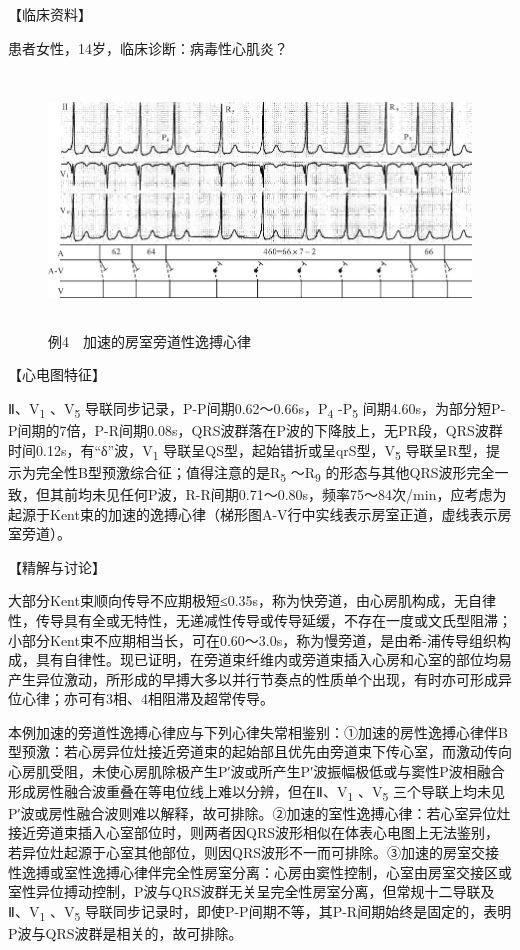 【临床资料】

患者女性，14岁，临床诊断：病毒性心肌炎？

\begin{figure}[!htbp]
 \centering
 \includegraphics[width=5.75in,height=2.65625in]{./images/Image00762.jpg}
 \captionsetup{justification=centering}
 \caption{例4　加速的房室旁道性逸搏心律}
 \label{fig50-4}
  \end{figure} 

【心电图特征】

Ⅱ、V\textsubscript{1} 、V\textsubscript{5}
导联同步记录，P-P间期0.62～0.66s，P\textsubscript{4} -P\textsubscript{5}
间期4.60s，为部分短P-P间期的7倍，P-R间期0.08s，QRS波群落在P波的下降肢上，无PR段，QRS波群时间0.12s，有“δ”波，V\textsubscript{1}
导联呈QS型，起始错折或呈qrS型，V\textsubscript{5}
导联呈R型，提示为完全性B型预激综合征；值得注意的是R\textsubscript{5}
～R\textsubscript{9}
的形态与其他QRS波形完全一致，但其前均未见任何P波，R-R间期0.71～0.80s，频率75～84次/min，应考虑为起源于Kent束的加速的逸搏心律（梯形图A-V行中实线表示房室正道，虚线表示房室旁道）。

【精解与讨论】

大部分Kent束顺向传导不应期极短≤0.35s，称为快旁道，由心房肌构成，无自律性，传导具有全或无特性，无递减性传导或传导延缓，不存在一度或文氏型阻滞；小部分Kent束不应期相当长，可在0.60～3.0s，称为慢旁道，是由希-浦传导组织构成，具有自律性。现已证明，在旁道束纤维内或旁道束插入心房和心室的部位均易产生异位激动，所形成的早搏大多以并行节奏点的性质单个出现，有时亦可形成异位心律；亦可有3相、4相阻滞及超常传导。

本例加速的旁道性逸搏心律应与下列心律失常相鉴别：①加速的房性逸搏心律伴B型预激：若心房异位灶接近旁道束的起始部且优先由旁道束下传心室，而激动传向心房肌受阻，未使心房肌除极产生P′波或所产生P′波振幅极低或与窦性P波相融合形成房性融合波重叠在等电位线上难以分辨，但在Ⅱ、V\textsubscript{1}
、V\textsubscript{5}
三个导联上均未见P′波或房性融合波则难以解释，故可排除。②加速的室性逸搏心律：若心室异位灶接近旁道束插入心室部位时，则两者因QRS波形相似在体表心电图上无法鉴别，若异位灶起源于心室其他部位，则因QRS波形不一而可排除。③加速的房室交接性逸搏或室性逸搏心律伴完全性房室分离：心房由窦性控制，心室由房室交接区或室性异位搏动控制，P波与QRS波群无关呈完全性房室分离，但常规十二导联及Ⅱ、V\textsubscript{1}
、V\textsubscript{5}
导联同步记录时，即使P-P间期不等，其P-R间期始终是固定的，表明P波与QRS波群是相关的，故可排除。

